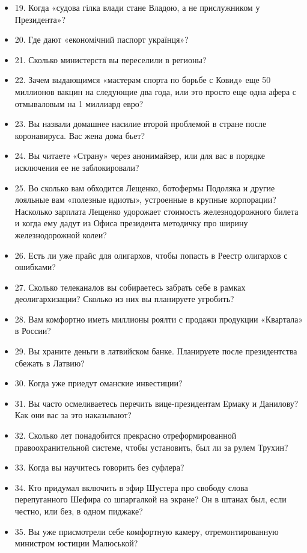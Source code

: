 \begin{itemize}
  \item 19. Когда «судова гілка влади стане Владою, а не прислужником у Президента»?
  \item 20. Где дают «економічний паспорт українця»?
  \item 21. Сколько министерств вы переселили в регионы?
  \item 22. Зачем выдающимся «мастерам спорта по борьбе с Ковид» еще 50 миллионов вакцин на следующие два года, или это просто еще одна афера с отмываловым на 1 миллиард евро? 
  \item 23. Вы назвали домашнее насилие второй проблемой в стране после коронавируса. Вас жена дома бьет? 
  \item 24. Вы читаете «Страну» через анонимайзер, или для вас в порядке исключения ее не заблокировали?
  \item 25. Во сколько вам обходится Лещенко, ботофермы Подоляка и другие лояльные вам «полезные идиоты», устроенные в крупные корпорации? Насколько зарплата Лещенко удорожает стоимость железнодорожного билета и когда ему дадут из Офиса президента методичку про ширину железнодорожной колеи? 
  \item 26. Есть ли уже прайс для олигархов, чтобы попасть в Реестр олигархов с ошибками?
  \item 27. Сколько телеканалов вы собираетесь забрать себе в рамках деолигархизации? Сколько из них вы планируете угробить?
  \item 28. Вам комфортно иметь миллионы роялти с продажи продукции «Квартала» в России?
  \item 29. Вы храните деньги в латвийском банке. Планируете после президентства сбежать в Латвию?
  \item 30. Когда уже приедут оманские инвестиции?
  \item 31. Вы часто осмеливаетесь перечить вице-президентам Ермаку и Данилову? Как они вас за это наказывают?
  \item 32. Сколько лет понадобится прекрасно отреформированной правоохранительной системе, чтобы установить, был ли за рулем Трухин?
  \item 33. Когда вы научитесь говорить без суфлера?
  \item 34. Кто придумал включить в эфир Шустера про свободу слова перепуганного Шефира со шпаргалкой на экране? Он в штанах был, если честно, или без, в одном пиджаке?
  \item 35. Вы уже присмотрели себе комфортную камеру, отремонтированную министром юстиции Малюськой?
\end{itemize}

